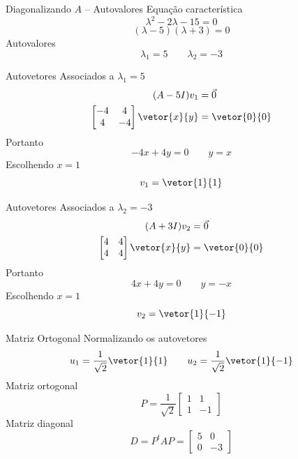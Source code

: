 \begin{resolution}{Diagonalizando $A$ -- Autovalores}
  Equação característica
  \[
    \lambda^2-2\lambda-15=0
  \]
  \[
    (\lambda-5)(\lambda+3)=0
  \]
  Autovalores
  \[
    \lambda_1=5
    \qquad
    \lambda_2=-3
  \]
\end{resolution}

\begin{resolution}{Autovetores Associados a $\lambda_1=5$}
  \begin{align*}
    (A-5I)v_1 & = \vec{0} \\
    \begin{bmatrix}
      -4&4\\
      4&-4
    \end{bmatrix}
    \vetor{x}{y}
    & = \vetor{0}{0}
  \end{align*}
  Portanto
  \[
    -4x+4y=0
    \qquad
    y=x
  \]
  Escolhendo \(x=1\)
  \[
    v_1=\vetor{1}{1}
  \]
\end{resolution}

\begin{resolution}{Autovetores Associados a $\lambda_2=-3$}
  \begin{align*}
    (A+3I)v_2 & = \vec{0} \\
    \begin{bmatrix}
      4&4\\
      4&4
    \end{bmatrix}
    \vetor{x}{y}
    & = \vetor{0}{0}
  \end{align*}
  Portanto
  \[
    4x+4y=0
    \qquad
    y=-x
  \]
  Escolhendo \(x=1\)
  \[
    v_2=\vetor{1}{-1}
  \]
\end{resolution}

\begin{resolution}{Matriz Ortogonal}
  Normalizando os autovetores
  \[
    u_1=\frac{1}{\sqrt{2}}\vetor{1}{1}
    \qquad
    u_2=\frac{1}{\sqrt{2}}\vetor{1}{-1}
  \]
  Matriz ortogonal
  \[
    P=\frac{1}{\sqrt{2}}
    \begin{bmatrix}
      1&1\\
      1&-1
    \end{bmatrix}
  \]
  Matriz diagonal
  \[
    D=P^tAP
    =\begin{bmatrix}
      5&0\\
      0&-3
    \end{bmatrix}
  \]
\end{resolution}

